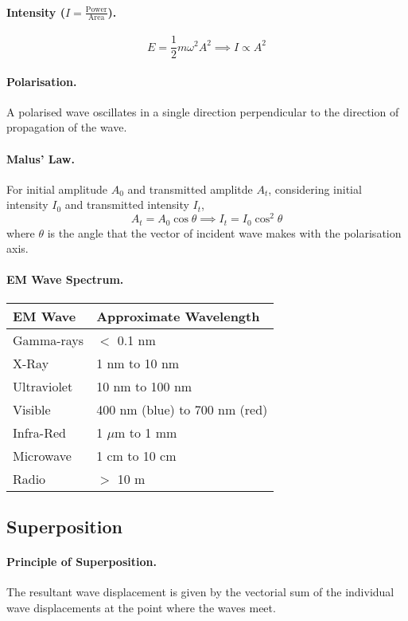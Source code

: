 \documentclass{article}
\begin{document}
\paragraph{Intensity ($I = \frac{\text{Power}}{\text{Area}}$).} \begin{equation}
E = \frac{1}{2}m\omega^2 A^2 \implies I \propto A^2
\end{equation}

\paragraph{Polarisation.} A polarised wave oscillates in a single direction perpendicular to the direction of propagation of the wave.

\paragraph{Malus' Law.} For initial amplitude $A_0$ and transmitted amplitde $A_t$, considering initial intensity $I_0$ and transmitted intensity $I_t$, \begin{equation}
A_t = A_0\cos\theta \implies I_t = I_0\cos^2\theta
\end{equation} where $\theta$ is the angle that the vector of incident wave makes with the polarisation axis.

\paragraph{EM Wave Spectrum.} \begin{tabular}{|l|l|}
\hline
\textbf{EM Wave} & \textbf{Approximate Wavelength} \\
\hline
Gamma-rays & $<$ 0.1 nm \\
X-Ray & 1 nm to 10 nm \\
Ultraviolet & 10 nm to 100 nm \\
Visible & 400 nm (blue) to 700 nm (red) \\
Infra-Red & 1 $\mu$m to 1 mm \\
Microwave & 1 cm to 10 cm \\
Radio & $>$ 10 m \\
\hline
\end{tabular}

\subsection{Superposition}

\paragraph{Principle of Superposition.} The resultant wave displacement is given by the vectorial sum of the individual wave displacements at the point where the waves meet.
\end{document}
